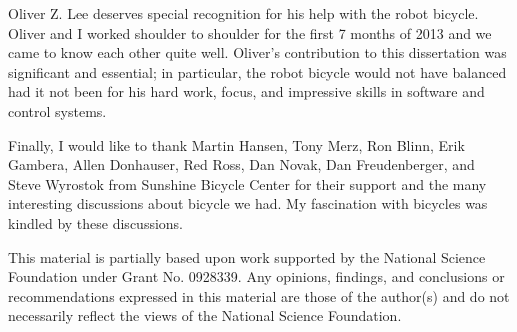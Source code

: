 Oliver Z. Lee deserves special recognition for his help with the robot bicycle.
Oliver and I worked shoulder to shoulder for the first 7 months of 2013 and we
came to know each other quite well. Oliver's contribution to this dissertation
was significant and essential; in particular, the robot bicycle would not have
balanced had it not been for his hard work, focus, and impressive skills in
software and control systems.

Finally, I would like to thank Martin Hansen, Tony Merz, Ron Blinn, Erik
Gambera, Allen Donhauser, Red Ross, Dan Novak, Dan Freudenberger, and Steve
Wyrostok from Sunshine Bicycle Center for their support and the many
interesting discussions about bicycle we had. My fascination with bicycles was
kindled by these discussions.

This material is partially based upon work supported by the National Science
Foundation under Grant No. 0928339. Any opinions, findings, and conclusions or
recommendations expressed in this material are those of the author(s) and do
not necessarily reflect the views of the National Science Foundation.


